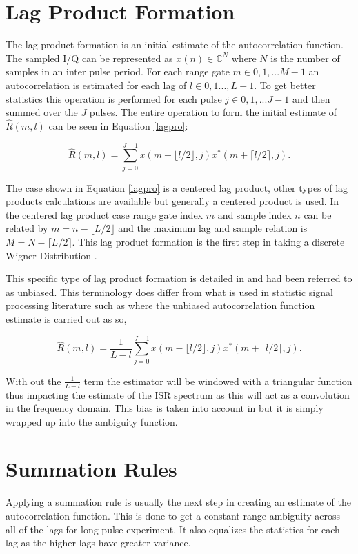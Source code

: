 \documentclass[10pt]{report}
\begin{document}
\section{Lag Product Formation}
The lag product formation is an initial estimate of the autocorrelation function. The sampled I/Q can be represented as $x(n) \in\mathbb{C}^N$ where $N$ is the number of samples in an inter pulse period. For each range gate $m\in 0,1,...M-1$ an autocorrelation is estimated for each lag of $l \in 0,1...,L-1$.  To get better statistics this operation is performed for each pulse $j\in 0,1,...J-1$ and then summed over the $J$ pulses. The entire operation to form the initial estimate of $\hat{R}(m,l)$ can be seen in Equation \ref{lagpro}:

\begin{equation}
\label{lagpro}
\hat{R}(m,l) = \displaystyle\sum\limits_{j=0}^{J-1} x(m-\lfloor l/2\rfloor,j)x^*(m+\lceil l/2 \rceil,j).
\end{equation}

The case shown in Equation \ref{lagpro} is a centered lag product, other types of lag products calculations are available but generally a centered product is used. In the centered lag product case range gate index $m$ and sample index $n$ can be related by $m=n-\lfloor L/2\rfloor$ and the maximum lag and sample relation is $M=N-\lceil L/2 \rceil$.  This lag product formation is the first step in taking a discrete Wigner Distribution \cite{TFAcohen}.

This specific type of lag product formation is detailed in \cite{farley1969} and had been referred to as unbiased. This terminology does differ from what is used in statistic signal processing literature such as \cite{randomsigshanmugan} where the unbiased autocorrelation function estimate is carried out as so,

\begin{equation}
\label{eq:lagproub}
\hat{R}(m,l) = \frac{1}{L-l}\displaystyle\sum\limits_{j=0}^{J-1} x(m-\lfloor l/2\rfloor,j)x^*(m+\lceil l/2 \rceil,j).
\end{equation}

\noindent With out the $\frac{1}{L-l}$ term the estimator will be windowed with a triangular function thus impacting the estimate of the ISR spectrum as this will act as a convolution in the frequency domain. This bias is taken into account in \cite{farley1969} but it is simply wrapped up into the ambiguity function. 

\section{Summation Rules}
Applying a summation rule is usually the next step in creating an estimate of the autocorrelation function.  This is done to get a constant range ambiguity across all of the lags for long pulse experiment\cite{nygren1996}. It also equalizes the statistics for each lag as the higher lags have greater variance. 
\end{document}
